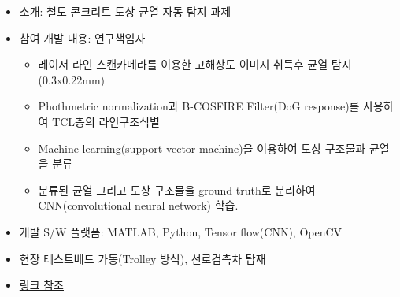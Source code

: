 \documentclass[10pt,a4paper,ragged2e]{altacv}
\begin{document}
\begin{fullwidth}
	\divider


	\begin{itemize}
		\item 소개: 철도 콘크리트 도상 균열 자동 탐지 과제
		\item 참여 개발 내용: 연구책임자
		      \begin{itemize}
			      \item 레이저 라인 스캔카메라를 이용한 고해상도 이미지 취득후 균열 탐지 (0.3x0.22mm)
			      \item Phothmetric normalization과 B-COSFIRE Filter(DoG response)를 사용하여 TCL층의 라인구조식별
			      \item Machine learning(support vector machine)을 이용하여 도상 구조물과 균열을 분류
			      \item 분류된 균열 그리고 도상 구조물을 ground truth로 분리하여 CNN(convolutional neural network) 학습.
		      \end{itemize}
		\item 개발 S/W 플랫폼: MATLAB, Python, Tensor flow(CNN), OpenCV
		\item 현장 테스트베드 가동(Trolley 방식), 선로검측차 탑재
		\item \href{https://eunchurn.com/engineering/2017/12/30/concrete-cracks-detection-using-b-cosfire-filter.html}{링크 참조}
	\end{itemize}


\end{fullwidth}
\end{document}

